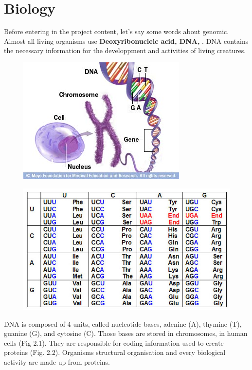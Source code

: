 \documentclass[a4paper,11pt]{report}
\begin{document}
\section{Biology}
Before entering in the project content, let's say some words about genomic. Almost all living organisms use \textbf{Deoxyribonucleic acid, DNA,} \cite{ref9}. DNA contains the necessary information for the developpment and activities of living creatures.

\begin{figure}[H]
\centering
\begin{minipage}{.5\textwidth}
  \centering
  \includegraphics[width=.8\linewidth]{img/chromosome}
  \label{fig:test1}
\end{minipage}%
\begin{minipage}{.5\textwidth}
  \centering
  \includegraphics[width=.7\linewidth]{img/geneticcode}
  \label{fig:test2}
\end{minipage}
\end{figure}

DNA is composed of 4 units, called nucleotide bases, adenine (A), thymine (T), guanine (G), and cytosine (C). Those bases are stored in chromosomes, in human cells (Fig 2.1). They are responsible for coding information used to create proteins (Fig. 2.2). Organisms structural organisation and every biological activity are made up from proteins.
\vspace{-0.6cm}
\end{document}
